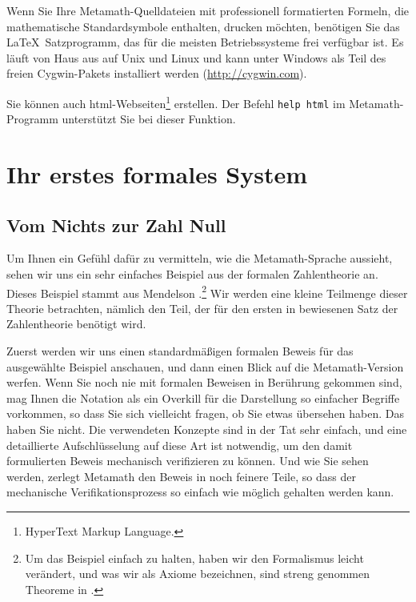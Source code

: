 Wenn Sie Ihre Metamath-Quelldateien mit professionell formatierten Formeln, die mathematische Standardsymbole enthalten, drucken möchten, benötigen Sie das \LaTeX\
Satzprogramm, das für die meisten Betriebssysteme frei verfügbar ist.  Es läuft von Haus aus auf Unix und Linux und kann unter Windows als Teil des freien Cygwin-Pakets installiert werden (\url{http://cygwin.com}).

Sie können auch {\sc html}-Webseiten\footnote{HyperText Markup Language.} erstellen.
Der Befehl {\tt help html} im Metamath-Programm unterstützt Sie bei dieser Funktion.

\section{Ihr erstes formales System}\label{start}
\subsection{Vom Nichts zur Zahl Null}\label{startf}

Um Ihnen ein Gefühl dafür zu vermitteln, wie die Metamath-Sprache aussieht, sehen wir uns ein sehr einfaches Beispiel aus der formalen Zahlentheorie an.  Dieses Beispiel stammt aus Mendelson \cite[S. 123]{Mendelson}.\footnote{Um das Beispiel einfach zu halten, haben wir den Formalismus leicht verändert, und was wir als
Axiome\index{Axiom} bezeichnen, sind streng genommen Theoreme\index{Theorem} in
\cite{Mendelson}.}  Wir werden eine kleine Teilmenge dieser Theorie betrachten, nämlich den Teil, der für den ersten in \cite{Mendelson} bewiesenen Satz der Zahlentheorie benötigt wird.

Zuerst werden wir uns einen standardmäßigen formalen Beweis für das ausgewählte Beispiel anschauen, und dann einen Blick auf die Metamath-Version werfen.  Wenn Sie noch nie mit formalen Beweisen in Berührung gekommen sind, mag Ihnen die Notation als ein Overkill für die Darstellung so einfacher Begriffe vorkommen, so dass Sie sich vielleicht fragen, ob Sie etwas übersehen haben.  Das haben Sie nicht.  Die verwendeten Konzepte sind in der Tat sehr einfach, und eine detaillierte Aufschlüsselung auf diese Art ist notwendig, um den damit formulierten Beweis mechanisch verifizieren zu können.  Und wie Sie sehen werden, zerlegt Metamath den Beweis in noch feinere Teile, so dass der mechanische Verifikationsprozess so einfach wie möglich gehalten werden kann.

